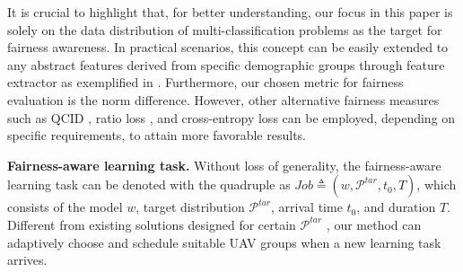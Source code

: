 \documentclass[lettersize,journal]{IEEEtran}
\begin{document}
It is crucial to highlight that, for better understanding, our focus in this paper is solely on the data distribution of multi-classification problems as the target for fairness awareness. In practical scenarios, this concept can be easily extended to any abstract features derived from specific demographic groups through feature extractor as exemplified in \cite{shuai2022balancefl}. Furthermore, our chosen metric for fairness evaluation is the norm difference. However, other alternative fairness measures such as QCID \cite{yang2021federated}, ratio loss \cite{wang2021addressing}, and cross-entropy loss \cite{mohri2019agnostic} can be employed, depending on specific requirements, to attain more favorable results.

\textbf{Fairness-aware learning task.} Without loss of generality, the fairness-aware learning task can be denoted with the quadruple as $Job\triangleq(w,\mathcal{P}^{tar},t_0, T)$, which consists of the model $w$, target distribution $\mathcal{P}^{tar}$, arrival time $t_0$, and duration $T$. Different from existing solutions designed for certain $\mathcal{P}^{tar}$ \cite{li2022data,zeng2022heterogeneous,hiessl2022cohort}, our method can adaptively choose and schedule suitable UAV groups when a new learning task arrives. 
\end{document}
